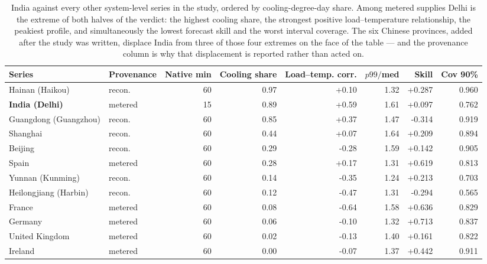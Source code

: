 \begin{table}[t]
\centering
\scriptsize
\setlength{\tabcolsep}{3pt}
\begin{tabular}{llrrrrrr}
\toprule
Series & Provenance & Native min & Cooling share & Load--temp. corr. & $p99/$med & Skill & Cov 90\% \\
\midrule
Hainan (Haikou) & recon. & 60 & 0.97 & +0.10 & 1.32 & +0.287 & 0.960 \\
\textbf{India (Delhi)} & metered & 15 & 0.89 & +0.59 & 1.61 & +0.097 & 0.762 \\
Guangdong (Guangzhou) & recon. & 60 & 0.85 & +0.37 & 1.47 & -0.314 & 0.919 \\
Shanghai & recon. & 60 & 0.44 & +0.07 & 1.64 & +0.209 & 0.894 \\
Beijing & recon. & 60 & 0.29 & -0.28 & 1.59 & +0.142 & 0.905 \\
Spain & metered & 60 & 0.28 & +0.17 & 1.31 & +0.619 & 0.813 \\
Yunnan (Kunming) & recon. & 60 & 0.14 & -0.35 & 1.24 & +0.213 & 0.703 \\
Heilongjiang (Harbin) & recon. & 60 & 0.12 & -0.47 & 1.31 & -0.294 & 0.565 \\
France & metered & 60 & 0.08 & -0.64 & 1.58 & +0.636 & 0.829 \\
Germany & metered & 60 & 0.06 & -0.10 & 1.32 & +0.713 & 0.837 \\
United Kingdom & metered & 60 & 0.02 & -0.13 & 1.40 & +0.161 & 0.822 \\
Ireland & metered & 60 & 0.00 & -0.07 & 1.37 & +0.442 & 0.911 \\
\bottomrule
\end{tabular}
\caption{India against every other system-level series in the study, ordered by cooling-degree-day share. Among metered supplies Delhi is the extreme of both halves of the verdict: the highest cooling share, the strongest positive load--temperature relationship, the peakiest profile, and simultaneously the lowest forecast skill and the worst interval coverage. The six Chinese provinces, added after the study was written, displace India from three of those four extremes on the face of the table --- and the provenance column is why that displacement is reported rather than acted on.}
\label{tab:india}
\end{table}
